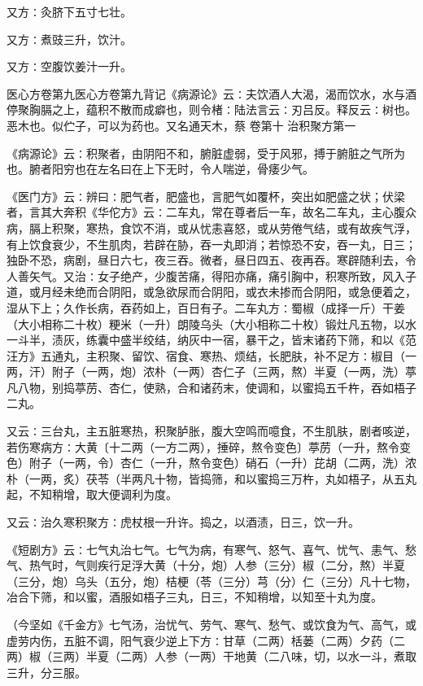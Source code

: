 \documentclass[a4paper,12pt,UTF8,twoside]{ctexbook}
\begin{document}
又方∶灸脐下五寸七壮。

又方∶煮豉三升，饮汁。

又方∶空腹饮姜汁一升。

医心方卷第九医心方卷第九背记《病源论》云∶夫饮酒人大渴，渴而饮水，水与酒停聚胸膈之上，蕴积不散而成癖也，则令楮∶陆法言云∶刃吕反。释反云∶树也。恶木也。似伫子，可以为药也。又名通天木，蔡
卷第十
治积聚方第一

《病源论》云∶积聚者，由阴阳不和，腑脏虚弱，受于风邪，搏于腑脏之气所为也。腑者阳穷也在左名曰在上下无时，令人喘逆，骨痿少气。

《医门方》云∶辨曰∶肥气者，肥盛也，言肥气如覆杯，突出如肥盛之状；伏梁者，言其大奔积《华佗方》云∶二车丸，常在尊者后一车，故名二车丸，主心腹众病，膈上积聚，寒热，食饮不消，或从忧恚喜怒，或从劳倦气结，或有故疾气浮，有上饮食衰少，不生肌肉，若辟在胁，吞一丸即消；若惊恐不安，吞一丸，日三；独卧不恐，病剧，昼日六七，夜三吞。微者，昼日四五、夜再吞。寒辟随利去，令人善矢气。又治∶女子绝产，少腹苦痛，得阳亦痛，痛引胸中，积寒所致，风入子道，或月经未绝而合阴阳，或急欲尿而合阴阳，或衣未掺而合阴阳，或急便着之，湿从下上；久作长病，吞药如上，百日有子。二车丸方∶蜀椒（成择一斤）干姜（大小相称二十枚）粳米（一升）朗陵乌头（大小相称二十枚）锻灶凡五物，以水一斗半，渍灰，练囊中盛半绞结，纳灰中一宿，暴干之，皆末诸药下筛，和以《范汪方》五通丸，主积聚、留饮、宿食、寒热、烦结，长肥肤，补不足方∶椒目（一两，汗）附子（一两，炮）浓朴（一两）杏仁子（三两，熬）半夏（一两，洗）葶凡八物，别捣葶苈、杏仁，使熟，合和诸药末，使调和，以蜜捣五千杵，吞如梧子二丸。

又云∶三台丸，主五脏寒热，积聚胪胀，腹大空鸣而噫食，不生肌肤，剧者咳逆，若伤寒病方∶大黄〔十二两（一方二两），捶碎，熬令变色〕葶苈（一升，熬令变色）附子（一两，令）杏仁（一升，熬令变色）硝石（一升）芘胡（二两，洗）浓朴（一两，炙）茯苓（半两凡十物，皆捣筛，和以蜜捣三万杵，丸如梧子，从五丸起，不知稍增，取大便调利为度。

又云∶治久寒积聚方∶虎杖根一升许。捣之，以酒渍，日三，饮一升。

《短剧方》云∶七气丸治七气。七气为病，有寒气、怒气、喜气、忧气、恚气、愁气、热气时，气则疾行足浮大黄（十分，炮）人参（三分）椒（二分，熬）半夏（三分，炮）乌头（五分，炮）桔梗（苓（三分）芎（分）仁（三分）凡十七物，冶合下筛，和以蜜，酒服如梧子三丸，日三，不知稍增，以知至十丸为度。

（今坚如《千金方》七气汤，治忧气、劳气、寒气、愁气、或饮食为气、高气，或虚劳内伤，五脏不调，阳气衰少逆上下方∶甘草（二两）栝蒌（二两）夕药（二两）椒（三两）半夏（二两）人参（一两）干地黄（二八味，切，以水一斗，煮取三升，分三服。
\end{document}
